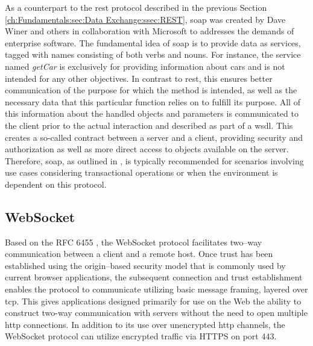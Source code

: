 As a counterpart to the \acrshort{rest} protocol described in the previous Section \ref{ch:Fundamentals:sec:Data Exchange:ssec:REST}, \acrshort{soap} was created by Dave Winer and others in collaboration with Microsoft \cite{patni_pro_2017} to addresses the demands of enterprise software.
The fundamental idea of \acrshort{soap} is to provide data as services, tagged with names consisting of both verbs and nouns. For instance, the service named \textit{getCar} is exclusively for providing information about cars and is not intended for any other objectives.
In contrast to \acrshort{rest}, this ensures better communication of the purpose for which the method is intended, as well as the necessary data that this particular function relies on to fulfill its purpose. All of this information about the handled objects and parameters is communicated to the client prior to the actual interaction and described as part of a \acrshort{wsdl}.
This creates a so-called contract between a server and a client, providing security and authorization as well as more direct access to objects available on the server.
Therefore, \acrshort{soap}, as outlined in \cite[4]{patni_pro_2017}, is typically recommended for scenarios involving use cases considering transactional operations or when the environment is dependent on this protocol.

\subsection{WebSocket}
\label{ch:Fundamentals:sec:Data Exchange:ssec:WebSocket}

Based on the RFC 6455 \cite{melnikov_websocket_2011}, the WebSocket protocol facilitates two--way communication between a client and a remote host. Once trust has been established using the origin--based security model that is commonly used by current browser applications, the subsequent connection and trust establishment enables the protocol to communicate utilizing basic message framing, layered over \acrshort{tcp}.
This gives applications designed primarily for use on the Web the ability to construct two-way communication with servers without the need to open multiple \acrshort{http} connections.
In addition to its use over unencrypted \acrshort{http} channels, the WebSocket protocol can utilize encrypted traffic via HTTPS on port 443.
